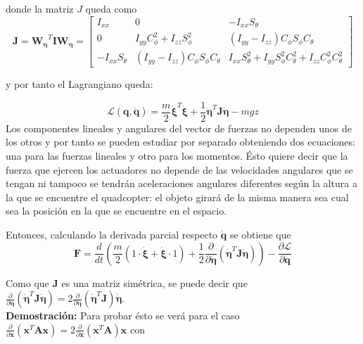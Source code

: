 \documentclass[twoside,11pt]{book}
\begin{document}
donde la matriz $J$ queda como
\begin{equation}
\pmb{J}=\pmb{W_\eta} ^{T}\pmb{I}\pmb{W_\eta} = \left[ \begin{array}{ccc}
I_{xx} & 0 & -I_{xx} S_\theta \\
0 & I_{yy} C^2_\phi + I_{zz} S^2_\phi & (I_{yy}-I_{zz}) C_{\phi} S_\phi C_\theta \\
-I_{xx} S_\theta & (I_{yy}-I_{zz}) C_{\phi} S_\phi C_\theta & I_{xx} S^2_{\theta}+I_{yy} S^2_{\phi} C^2_\theta +I_{zz}C^2_{\phi} C^2_{\theta}
\end{array} \right]
\end{equation} 

y por tanto el Lagrangiano queda:

\begin{equation}
\mathcal{L}(\pmb{q},\pmb{\dot{q}})=\frac{m}{2} \pmb{\dot{\xi}}^T \pmb{\dot{\xi}} + \frac{1}{2}\pmb{\dot{\eta}}^{T}\pmb{J}\pmb{\dot{\eta}} - mgz
\end{equation}
Los componentes lineales y angulares del vector de fuerzas no dependen unos de los otros y por tanto se pueden estudiar por separado obteniendo dos ecuaciones: una para las fuerzas lineales y otro para los momentos. Ésto quiere decir que la fuerza que ejercen los actuadores no depende de las velocidades angulares que se tengan ni tampoco se tendrán aceleraciones angulares diferentes según la altura a la que se encuentre el quadcopter: el objeto girará de la misma manera sea cual sea la  posición en la que se encuentre en el espacio.

Entonces, calculando la derivada parcial respecto $\pmb{\dot{q}}$ se obtiene que 
\begin{equation}
\pmb{F}=\frac{d}{dt}\left(\frac{m}{2}(1\cdot \pmb{ \dot{\xi}}+\pmb{\dot{\xi}}\cdot 1)+\frac{1}{2}\frac{\partial}{\partial \pmb{\dot{\eta}}}(\pmb{\dot{\eta}}^{T}\pmb{J}\pmb{\dot{\eta}})\right)-\frac{\partial \mathcal{L}}{\partial \pmb{q}}
\end{equation}

Como que $\pmb{J}$ es una matriz simétrica, se puede decir que  $\frac{\partial}{\partial \pmb{\dot{\eta}}}(\pmb{\dot{\eta}}^{T}\pmb{J}\pmb{\dot{\eta}})=2 \frac{\partial}{\partial \pmb{\dot{\eta}}}(\pmb{\dot{\eta}}^{T}\pmb{J})\pmb{\dot{\eta}} $. \\

\textbf{Demostración:} Para probar ésto se verá para el caso $\frac{\partial}{\partial \pmb{x}}(\pmb{x}^{T}\pmb{A}\pmb{x})=2 \frac{\partial}{\partial \pmb{x}}(\pmb{x}^{T}\pmb{A})\pmb{x} $ con 
\end{document}
